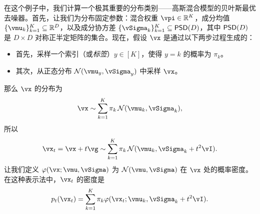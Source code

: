 \documentclass[../../book-main_zh.tex]{subfiles}
\begin{document}
\begin{example}[从高斯混合模型中去噪高斯噪声]\label{example:denoising_gaussian_mixture}
	在这个例子中，我们计算一个极其重要的分布类别——高斯混合模型的贝叶斯最优去噪器。首先，让我们为分布固定参数：混合权重 \(\vpi \in \R^{K}\)，成分均值 \(\{\vmu_{k}\}_{k = 1}^{K} \subseteq \R^{D}\)，以及成分协方差 \(\{\vSigma_{k}\}_{k = 1}^{K} \subseteq \PSD(D)\)，其中 \(\mathsf{PSD}(D)\) 是 \(D \times D\) 对称正半定矩阵的集合。现在，假设 \(\vx\) 是通过以下两步过程生成的：
	\begin{itemize}
		\item 首先，采样一个索引（或\textit{标签}）\(y \in [K]\)，使得 \(y = k\) 的概率为 \(\pi_{k}\)。
		\item 其次，从正态分布 \(\dNorm(\vmu_{y}, \vSigma_{y})\) 中采样 \(\vx\)。
	\end{itemize}
	那么 \(\vx\) 的分布为
	\begin{equation}
		\vx \sim \sum_{k = 1}^{K}\pi_{k}\dNorm(\vmu_{k}, \vSigma_{k}),
	\end{equation}
	所以
	\begin{equation}
		\vx_{t} = \vx + t\vg \sim \sum_{k = 1}^{K}\pi_{k}\dNorm(\vmu_{k}, \vSigma_{k} + t^{2}\vI).
	\end{equation}
	让我们定义 \(\phi(\vx ; \vmu, \vSigma)\) 为 \(\dNorm(\vmu, \vSigma)\) 在 \(\vx\) 处的概率密度。在这种表示法中，\(\vx_{t}\) 的密度是
	\begin{equation}
		p_{t}(\vx_{t}) = \sum_{k = 1}^{K}\pi_{k}\phi(\vx_{t} ; \vmu_{k}, \vSigma_{k} + t^{2}\vI).
	\end{equation}


\end{example}
\end{document}
